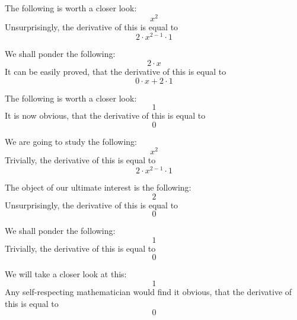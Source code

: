 \documentclass{article}
\begin{document}
The following is worth a closer look:
\begin{equation}
x ^{2 } 
\end{equation}
Unsurprisingly, the derivative of this is equal to
\begin{equation}
2 \cdot x ^{2 - 1 } \cdot 1 
\end{equation}

We shall ponder the following:
\begin{equation}
2 \cdot x 
\end{equation}
It can be easily proved, that the derivative of this is equal to
\begin{equation}
0 \cdot x + 2 \cdot 1 
\end{equation}

The following is worth a closer look:
\begin{equation}
1 
\end{equation}
It is now obvious, that the derivative of this is equal to
\begin{equation}
0 
\end{equation}

We are going to study the following:
\begin{equation}
x ^{2 } 
\end{equation}
Trivially, the derivative of this is equal to
\begin{equation}
2 \cdot x ^{2 - 1 } \cdot 1 
\end{equation}

The object of our ultimate interest is the following:
\begin{equation}
2 
\end{equation}
Unsurprisingly, the derivative of this is equal to
\begin{equation}
0 
\end{equation}

We shall ponder the following:
\begin{equation}
1 
\end{equation}
Trivially, the derivative of this is equal to
\begin{equation}
0 
\end{equation}

We will take a closer look at this:
\begin{equation}
1 
\end{equation}
Any self-respecting mathematician would find it obvious, that the derivative of this is equal to
\begin{equation}
0 
\end{equation}
\end{document}
